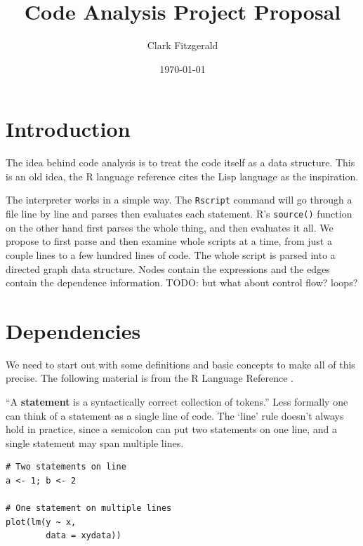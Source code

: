 \documentclass[12pt]{article}
\begin{document}
\title{Code Analysis Project Proposal}
\date{\today}
\author{Clark Fitzgerald}
\maketitle

\begin{abstract}

\end{abstract}

\section{Introduction}

The idea behind code analysis is to treat the code itself as a data
structure. This is an old idea, the R language reference cites the Lisp
language as the inspiration.

The interpreter works in a simple way. The \texttt{Rscript} command will go
through a file line by line and parses then
evaluates each statement. R's \texttt{source()} function on the other hand
first parses the whole thing, and then evaluates it all. We propose to
first parse and then examine whole scripts at a time, from just a couple
lines to a few hundred lines of code.  The whole script is parsed into a
directed graph data structure. Nodes contain the expressions and the edges
contain the dependence information.  TODO: but what about control flow?
loops?

\section{Dependencies}

We need to start out with some definitions and basic concepts to make all
of this precise. The following material is from the R
Language Reference \cite{Rlang}.

``A \textbf{statement} is a
syntactically correct collection of tokens.'' Less formally one can think of
a statement as a single line of code. The `line' rule doesn't always hold in practice,
since a semicolon can put two statements on one line, and a single
statement may span multiple lines.

\begin{verbatim}
# Two statements on line
a <- 1; b <- 2

# One statement on multiple lines
plot(lm(y ~ x,
        data = xydata))
\end{verbatim}
\end{document}
